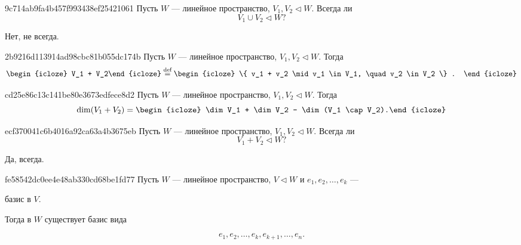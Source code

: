 \begin{note}{9c714ab9fa4b457f993438ef25421061}
    Пусть \( W \) --- линейное пространство, \( V_1, V_2 \triangleleft W \).
    Всегда ли
    \[
        V_1 \cup V_2 \triangleleft W?
    \]

    \begin{cloze}{1}
        Нет, не всегда.
    \end{cloze}
\end{note}

\begin{note}{2b9216d113914ad98cbc81b055dc174b}
    Пусть \( W \) --- линейное пространство, \( V_1, V_2 \triangleleft W \).
    Тогда
    \[
        \begin{icloze}{2}V_1 + V_2\end{icloze} \overset{\text{def}}= \begin{icloze}{1}
            \{ v_1 + v_2 \mid v_1 \in V_1, \quad v_2 \in V_2 \} .
        \end{icloze}
    \]
\end{note}

\begin{note}{cd25e86c13c141be80e3673edfece8d2}
    Пусть \( W \) --- линейное пространство, \( V_1, V_2 \triangleleft W \).
    Тогда
    \[
        \dim (V_1 + V_2) = \begin{icloze}{1}\dim V_1 + \dim V_2 - \dim (V_1 \cap V_2).\end{icloze}
    \]
\end{note}

\begin{note}{ecf370041c6b4016a92ca63a4b3675eb}
    Пусть \( W \) --- линейное пространство, \( V_1, V_2 \triangleleft W \).
    Всегда ли
    \[
        V_1 + V_2 \triangleleft W?
    \]

    \begin{cloze}{1}
        Да, всегда.
    \end{cloze}
\end{note}

\begin{note}{fe58542dc0ee4e48ab330cd68be1fd77}
    Пусть \( W \) --- линейное пространство, \( V \triangleleft W \) и \( e_1, e_2, \ldots, e_k  \)  --- \begin{icloze}{2}базис в \( V. \)\end{icloze}
    Тогда в \( W \) существует базис вида \begin{icloze}{1}
        \[
            e_1, e_2, \ldots, e_k, e_{k + 1}, \ldots, e_n.
        \]
    \end{icloze}
\end{note}

